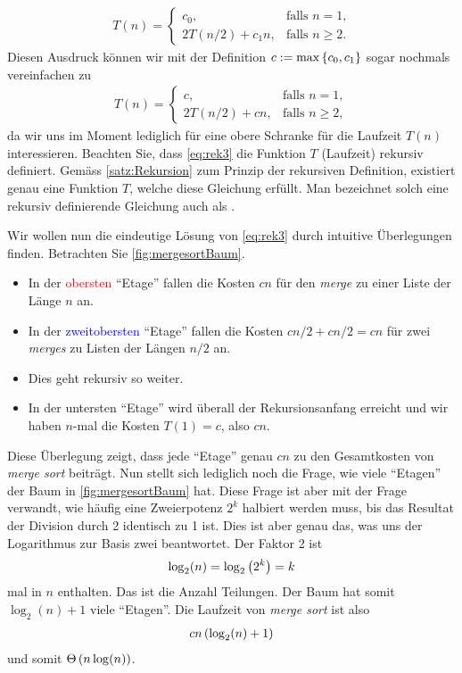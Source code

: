 \begin{align}\label{eq:rek2}
  T(n) = 
  \begin{cases}
    c_0, &\text{falls $n = 1$,} \\
    2T(n/2) + c_1n, & \text{falls $n\geq 2$}.
  \end{cases}
\end{align}
Diesen Ausdruck können wir mit der Definition $c := \max\left\{c_0,c_1\right\}$ sogar nochmals vereinfachen zu
\begin{align}\label{eq:rek3}
  T(n) = 
  \begin{cases}
    c, &\text{falls $n = 1$,} \\
    2T(n/2) + cn, & \text{falls $n\geq 2$},
  \end{cases}
\end{align}
da wir uns im Moment lediglich für eine obere Schranke für die Laufzeit $T(n)$ interessieren. Beachten Sie, dass \cref{eq:rek3} die Funktion $T$ (Laufzeit) rekursiv definiert. Gemäss \cref{satz:Rekursion} zum Prinzip der rekursiven Definition, existiert genau eine Funktion $T$, welche diese Gleichung erfüllt. Man bezeichnet solch eine rekursiv definierende Gleichung auch als . 

Wir wollen nun die eindeutige Lösung von \cref{eq:rek3} durch intuitive Überlegungen finden. Betrachten Sie \cref{fig:mergesortBaum}.
\begin{itemize}
  \item In der \textcolor{Red}{obersten} \enquote{Etage} fallen die Kosten $cn$ für den \textit{merge} zu einer Liste der Länge $n$ an.
  \item In der \textcolor{Blue}{zweitobersten} \enquote{Etage} fallen die Kosten $cn/2 + cn/2 = cn$ für zwei \textit{merges} zu Listen der Längen $n/2$ an.
  \item Dies geht rekursiv so weiter.
  \item In der untersten \enquote{Etage} wird überall der Rekursionsanfang erreicht und wir haben $n$-mal die Kosten $T(1) = c$, also $cn$.
\end{itemize}
Diese Überlegung zeigt, dass jede \enquote{Etage} genau $cn$ zu den Gesamtkosten von \textit{merge sort} beiträgt. Nun stellt sich lediglich noch die Frage, wie viele \enquote{Etagen} der Baum in \cref{fig:mergesortBaum} hat. Diese Frage ist aber mit der Frage verwandt, wie häufig eine Zweierpotenz $2^k$ halbiert werden muss, bis das Resultat der Division durch 2 identisch zu 1 ist. Dies ist aber genau das, was uns der Logarithmus zur Basis zwei beantwortet. Der Faktor 2 ist
\begin{align*}
  \log_2(n) = \log_2\left(2^k\right) = k
\end{align*}
mal in $n$ enthalten. Das ist die Anzahl Teilungen. Der Baum hat somit $\log_2(n) + 1$ viele \enquote{Etagen}. Die Laufzeit von \textit{merge sort} ist also
\begin{align*}
  cn\left(\log_2(n) + 1\right)
\end{align*}
und somit $\Theta\left(n\log(n)\right)$.

